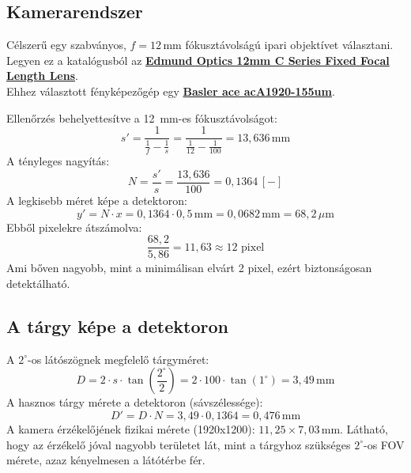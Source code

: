 \newpage
\subsection{Kamerarendszer}
Célszerű egy szabványos, $f = 12 \, \text{mm}$ fókusztávolságú ipari objektívet választani. Legyen ez a katalógusból az \href{https://www.edmundoptics.com/f/c-series-fixed-focal-length-lenses/13679/}{\textbf{Edmund Optics 12mm C Series Fixed Focal Length Lens}}. \\
Ehhez választott fényképezőgép egy \href{https://www.baslerweb.com/en/shop/aca1920-155um/}{\textbf{Basler ace acA1920-155um}}.

Ellenőrzés behelyettesítve a 12~mm-es fókusztávolságot:
\begin{equation}
    s' = \frac{1}{\frac{1}{f} - \frac{1}{s}} = \frac{1}{\frac{1}{12} - \frac{1}{100}} = 13{,}636 \, \text{mm}
\end{equation}
A tényleges nagyítás:
\begin{equation}
    N = \frac{s'}{s} = \frac{13{,}636}{100} = 0{,}1364 \, [-]
\end{equation}
A legkisebb méret képe a detektoron:
\begin{equation}
    y' = N \cdot x = 0{,}1364 \cdot 0{,}5 \, \text{mm} = 0{,}0682 \, \text{mm} = 68{,}2 \, \mu\text{m}
\end{equation}
Ebből pixelekre átszámolva:
\begin{equation}
    \frac{68{,}2}{5{,}86} = 11{,}63 \approx 12 \text{ pixel}
\end{equation}
Ami bőven nagyobb, mint a minimálisan elvárt 2 pixel, ezért biztonságosan detektálható.

\subsection{A tárgy képe a detektoron}
A $2^\circ$-os látószögnek megfelelő tárgyméret:
\begin{equation}
    D = 2 \cdot s \cdot \tan\left(\frac{2^\circ}{2}\right) = 2 \cdot 100 \cdot \tan(1^\circ) = 3{,}49 \, \text{mm}
\end{equation}
A hasznos tárgy mérete a detektoron (sávszélessége):
\begin{equation}
    D' = D \cdot N = 3{,}49 \cdot 0{,}1364 = 0{,}476 \, \text{mm}
\end{equation}
A kamera érzékelőjének fizikai mérete (1920x1200): $11{,}25 \times 7{,}03 \, \text{mm}$.
Látható, hogy az érzékelő jóval nagyobb területet lát, mint a tárgyhoz szükséges $2^\circ$-os FOV mérete, azaz kényelmesen a látótérbe fér.

